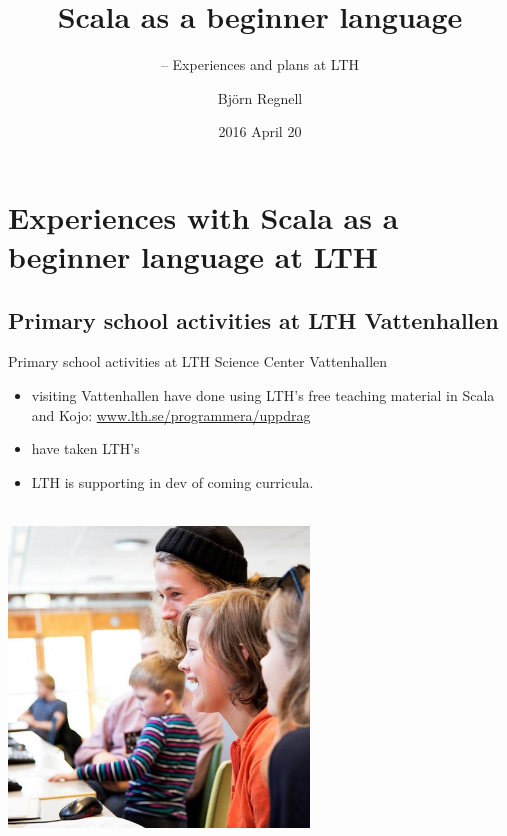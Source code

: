 \documentclass{lecturenotes}
\title[Scala as a beginner language]{Scala as a beginner language}
\subtitle{-- Experiences and plans at LTH}
\author{Björn Regnell}
\institute{Dept. of Computer Science, LTH \\ Lund University, Sweden}
\date{2016 April 20}
\begin{document}
\frame{\titlepage}


\section[Experiences with Scala at LTH]{Experiences with Scala as a beginner language at LTH}

\subsection[Scala at LTH Science Center Vattenhallen]{Primary school activities at LTH Vattenhallen}

\begin{Slide}{Primary school activities at LTH Science Center Vattenhallen}
\begin{multicols}{2}

\footnotesize
\begin{itemize}
\item {} visiting Vattenhallen have done  using LTH's free teaching material in Scala and Kojo:
\href{http://www.lth.se/programmera/uppdrag}{www.lth.se/programmera/uppdrag} \\ 

\item {} have taken LTH's  

\item LTH is supporting  in dev of coming curricula. \\\\ 




\end{itemize}
\columnbreak
\includegraphics[width=0.6\textwidth]{../../img/kids}
\end{multicols}

\end{Slide}
\end{document}
